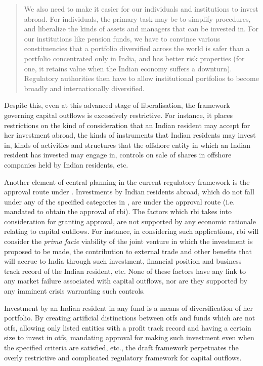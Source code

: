 \documentclass[11pt,a4paper]{article} \usepackage[parfill]{parskip}
\begin{document}
\begin{description}
\begin{quote}
  We also need to make it easier for our individuals and institutions
  to invest abroad. For individuals, the primary task may be to
  simplify procedures, and liberalize the kinds of assets and managers
  that can be invested in. For our institutions like pension funds, we
  have to convince various constituencies that a portfolio diversified
  across the world is safer than a portfolio concentrated only in
  India, and has better risk properties (for one, it retains value
  when the Indian economy suffers a downturn). Regulatory authorities
  then have to allow institutional portfolios to become broadly and
  internationally diversified.
\end{quote}

Despite this, even at this advanced stage of liberalisation, the
framework governing capital outflows is excessively restrictive. For
instance, it places restrictions on the kind of consideration that an
Indian resident may accept for her investment abroad, the kinds of
instruments that Indian residents may invest in, kinds of activities
and structures that the offshore entity in which an Indian resident
has invested may engage in, controls on sale of shares in offshore
companies held by Indian residents, etc.

Another element of central planning in the current regulatory
framework is the approval route under . Investments
by Indian residents abroad, which do not fall under any of the
specified categories in , are under the approval
route (i.e. mandated to obtain the approval of \gls{rbi}). The factors
which \gls{rbi} takes into consideration for granting approval, are
not supported by any economic rationale relating to capital
outflows. For instance, in considering such applications, \gls{rbi}
will consider the \textsl{prima facie} viability of the joint venture
in which the investment is proposed to be made, the contribution to
external trade and other benefits that will accrue to India through
such investment, financial position and business track record of the
Indian resident, etc. None of these factors have any link to any
market failure associated with capital outflows, nor are they
supported by any imminent crisis warranting such controls.

Investment by an Indian resident in any fund is a means of
diversification of her portfolio. By creating artificial distinctions
between \glspl{otf} and funds which are not \glspl{otf}, allowing only
listed entities with a profit track record and having a certain size
to invest in \glspl{otf}, mandating approval for making such
investment even when the specified criteria are satisfied, etc., the
draft framework perpetuates the overly restrictive and complicated
regulatory framework for capital outflows.



\end{description}
\end{document}
